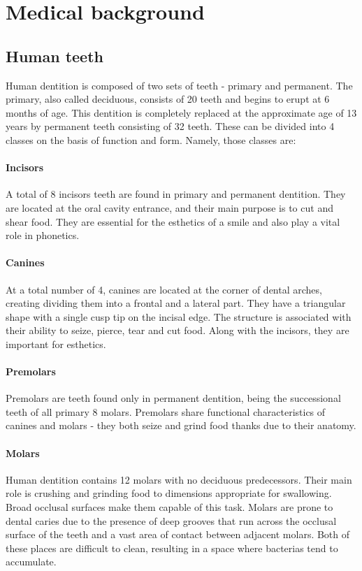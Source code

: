 \chapter{Medical background}

\section{Human teeth}
Human dentition is composed of two sets of teeth - primary and permanent. The primary, also called deciduous, consists of 20 teeth and begins to erupt at 6 months of age. This dentition is completely replaced at the approximate age of 13 years by permanent teeth consisting of 32 teeth. These can be divided into 4 classes on the basis of function and form. Namely, those classes are:

\subsubsection*{Incisors}
A total of 8 incisors teeth are found in primary and permanent dentition. They are located at the oral cavity entrance, and their main purpose is to cut and shear food. They are essential for the esthetics of a smile and also play a vital role in phonetics.

\subsubsection*{Canines}
At a total number of 4, canines are located at the corner of dental arches, creating dividing them into a frontal and a lateral part. They have a triangular shape with a single cusp tip on the incisal edge. The structure is associated with their ability to seize, pierce, tear and cut food. Along with the incisors, they are important for esthetics.

\subsubsection*{Premolars}
Premolars are teeth found only in permanent dentition, being the successional teeth of all primary 8 molars. Premolars share functional characteristics of canines and molars - they both seize and grind food thanks due to their anatomy.

\subsubsection*{Molars}
Human dentition contains 12 molars with no deciduous predecessors. Their main role is crushing and grinding food to dimensions appropriate for swallowing. Broad occlusal surfaces make them capable of this task. Molars are prone to dental caries due to the presence of deep grooves that run across the occlusal surface of the teeth and a vast area of contact between adjacent molars. Both of these places are difficult to clean, resulting in a space where bacterias tend to accumulate.


